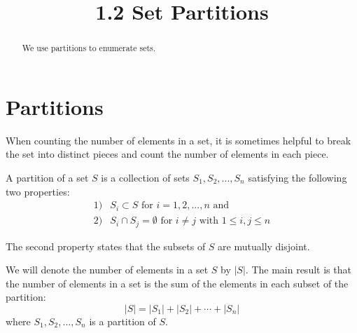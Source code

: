 \documentclass[handout]{ximera}
\title{1.2 Set Partitions}
\begin{document}
\begin{abstract}
We use partitions to enumerate sets.
\end{abstract}

\maketitle

\section{Partitions}

When counting the number of elements in a set, it is sometimes helpful to break the set into distinct pieces and 
count the number of elements in each piece. 

\begin{definition}[Partition]
A partition of a set $S$ is a collection of sets $S_1, S_2, ..., S_n$ satisfying the 
following two properties:
\begin{align*}
1) & S_i \subset S \text{ for } i = 1, 2, ..., n \text{ and} \\
2) & S_i \cap S_j = \emptyset \text{ for } i \neq j \text{ with } 1 \leq i,j \leq n
\end{align*}
\end{definition}

\begin{image}
\end{image}
\begin{remark}
The second property states that the subsets of $S$ are mutually disjoint.
\end{remark}

We will denote the number of elements in a set $S$ by $|S|$. The main result
 is that the number of elements in a set is the sum of the elements in each 
subset of the partition:
\[
|S| = |S_1| + |S_2|+ \cdots + |S_n|
\]
where $S_1, S_2, ..., S_n$ is a partition of $S$.
\end{document}
